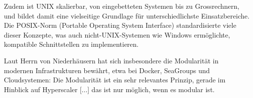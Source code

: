 Zudem ist UNIX skalierbar, von eingebetteten Systemen bis zu Grossrechnern, und bildet damit eine vielseitige Grundlage für unterschiedlichste Einsatzbereiche. Die POSIX-Norm (Portable Operating System Interface) standardisierte viele dieser Konzepte, was auch nicht-UNIX-Systemen wie Windows ermöglichte, kompatible Schnittstellen zu implementieren.

Laut Herrn von Niederhäusern hat sich insbesondere die Modularität in modernen Infrastrukturen bewährt, etwa bei Docker, SeaGroups und Cloudsystemen: \glqq Die Modularität ist ein sehr relevantes Prinzip, gerade im Hinblick auf Hyperscaler [...] das ist nur möglich, wenn es modular ist.\grqq \ \cite{interviewNH}